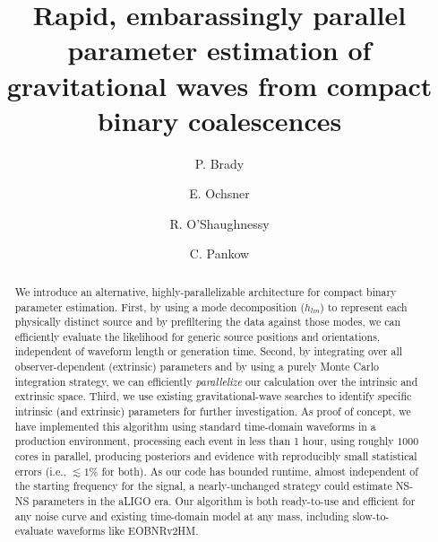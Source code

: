 \documentclass[twocolumn,prd,nofootinbib]{revtex4}
\begin{document}
\title{Rapid, embarassingly parallel parameter estimation of gravitational waves from compact binary coalescences}
\author{P. Brady}
\author{E. Ochsner}
\author{R. O'Shaughnessy}
\author{C. Pankow}

\begin{abstract}
We  introduce an alternative, highly-parallelizable architecture for compact binary parameter estimation.   
%   
First, by using a mode decomposition  ($h_{lm}$) to represent each physically distinct source and by
prefiltering the data against those modes, we can efficiently evaluate the likelihood for generic source positions and
orientations, independent of waveform length or generation time.   
% 
Second, by integrating over all observer-dependent (extrinsic) parameters and by using a purely Monte Carlo
integration strategy, we can efficiently \emph{parallelize} our calculation over the intrinsic and extrinsic space.  
%
Third, we use existing gravitational-wave searches to identify specific intrinsic (and extrinsic) parameters for further
investigation.  
As  proof of concept, we have implemented this algorithm using standard time-domain waveforms in a
production environment, processing  each event in less than 1 hour, using roughly $1000$ cores in parallel,
producing posteriors and evidence with reproducibly small statistical errors (i.e., $\lesssim 1\%$ for both).   
%
%
As our code has bounded runtime, almost independent of the starting frequency for the signal, a nearly-unchanged strategy could
 estimate NS-NS parameters in the aLIGO era.  
Our algorithm is both ready-to-use and efficient for any noise curve and existing time-domain model at any mass, including
slow-to-evaluate waveforms like EOBNRv2HM.  
\end{abstract}
\maketitle
\end{document}
